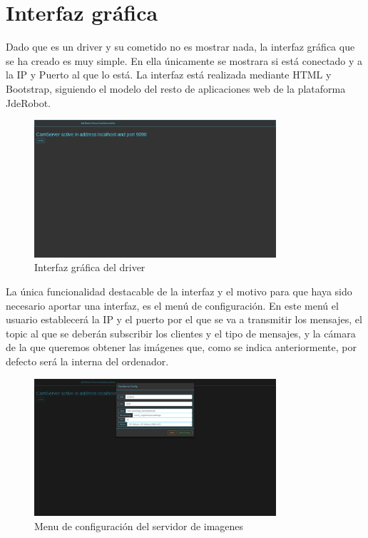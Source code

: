 \section{Interfaz gráfica}
Dado que es un driver y su cometido no es mostrar nada, la interfaz gráfica que se ha creado es muy simple. En ella únicamente se mostrara si está conectado y a la IP y Puerto al que lo está. 
La interfaz está realizada mediante HTML y Bootstrap, siguiendo el modelo del resto de aplicaciones web de la plataforma JdeRobot.
\begin{figure}[H]
  \begin{center}
    \includegraphics[width=0.8\textwidth]{figures/Interfazcamserver.png}
		\caption{Interfaz gráfica del driver}
		\label{fig.interfazcamserver}
		\end{center}
\end{figure}
La única funcionalidad destacable de la interfaz y el motivo para que haya sido necesario aportar una interfaz, es el menú de configuración. En este menú el usuario establecerá la IP y el puerto por el que se va a transmitir los mensajes, el topic al que se deberán subscribir los clientes y el tipo de mensajes, y la cámara de la que queremos obtener las imágenes que, como se indica anteriormente, por defecto será la interna del ordenador.
 \begin{figure}[H]
  \begin{center}
    \includegraphics[width=0.8\textwidth]{figures/configcamserver.png}
		\caption{Menu de configuración del servidor de imagenes}
		\label{fig.configcamserver}
		\end{center}
\end{figure}

